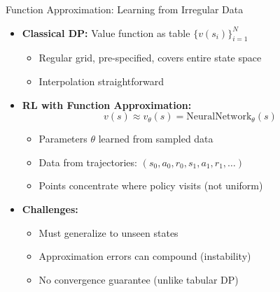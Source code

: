 \documentclass[10pt,english,aspectratio=169]{beamer}
\begin{document}
\begin{frame}{Function Approximation: Learning from Irregular Data}
\begin{itemize}
\item \textbf{Classical DP:} Value function as table $\{v(s_i)\}_{i=1}^{N}$
\begin{itemize}
    \item Regular grid, pre-specified, covers entire state space
    \item Interpolation straightforward
\end{itemize}

\medskip
\item \textbf{RL with Function Approximation:}
\[
v(s) \approx v_\theta(s) = \text{NeuralNetwork}_\theta(s)
\]
\begin{itemize}
    \item Parameters $\theta$ learned from sampled data
    \item Data from trajectories: $(s_0, a_0, r_0, s_1, a_1, r_1, \ldots)$
    \item Points concentrate where policy visits (not uniform)
\end{itemize}

\medskip
\item \textbf{Challenges:}
\begin{itemize}
    \item Must generalize to unseen states
    \item Approximation errors can compound (instability)
    \item No convergence guarantee (unlike tabular DP)
\end{itemize}
\end{itemize}
\end{frame}
\end{document}
